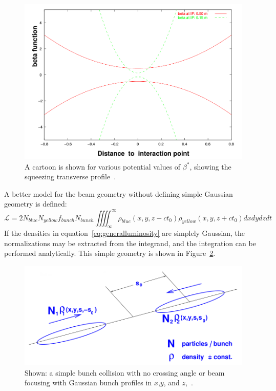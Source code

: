 \begin{figure}[h]
  \centering
  \includegraphics[width=0.8\linewidth]{./figures/beta_function.png}
  \caption{
    A cartoon is shown for various potential values of $\beta^*$, showing the
    squeezing transverse profile~\cite{Herr2003a}.
  }
  \label{fig:beta_squeeze}

\end{figure}

A better model for the beam geometry without defining simple Gaussian geometry
is defined:
\begin{equation}
\label{eq:generalluminosity}
\mathcal{L} = 2N_{blue}N_{yellow}f_{bunch}N_{bunch}\iiiint _{\infty}^{ \infty}{
\rho_{blue} (x,y,z-ct_0)\rho_{yellow} (x,y,z+ct_0)} dxdydzdt
\end{equation}
If the densities in equation~\ref{eq:generalluminosity} are simplely Gaussian,
the normalizations may be extracted from the integrand, and the integration can
be performed analytically. This simple geometry is shown in
Figure~\ref{fig:simple_bunch_xing}.

\begin{figure}
  \centering
  \includegraphics[width=0.75\linewidth]{./figures/simple_bunch_head_on.png}
  \caption{
    Shown: a simple bunch collision with no crossing angle or beam focusing with
    Gaussian bunch profiles in $x$,$y$, and $z$,~\cite{Herr2003a}.
  }
  \label{fig:simple_bunch_xing}
\end{figure}

